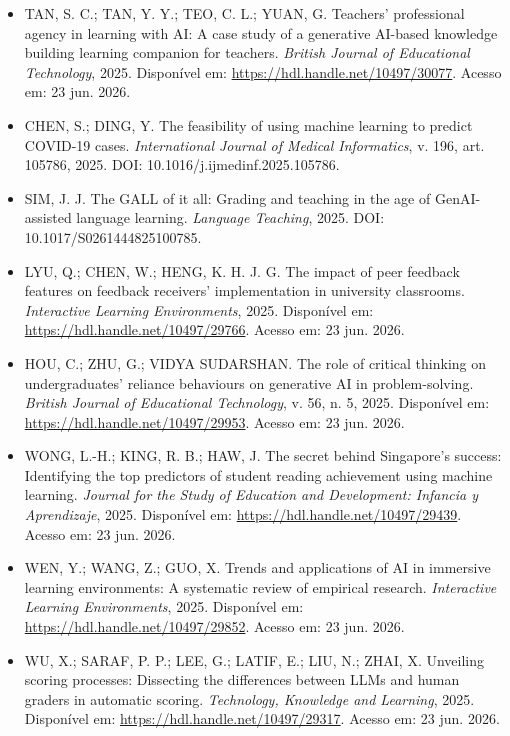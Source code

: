 \documentclass[english]{textolivre}
\begin{document}
\begin{itemize}
\item[] TAN, S. C.; TAN, Y. Y.; TEO, C. L.; YUAN, G. Teachers’ professional agency in learning with AI: A case study of a generative AI-based knowledge building learning companion for teachers. \textit{British Journal of Educational Technology}, 2025. Disponível em: \url{https://hdl.handle.net/10497/30077}. Acesso em: 23 jun. 2026.

\item[] CHEN, S.; DING, Y. The feasibility of using machine learning to predict COVID-19 cases. \textit{International Journal of Medical Informatics}, v. 196, art. 105786, 2025. DOI: 10.1016/j.ijmedinf.2025.105786.

\item[] SIM, J. J. The GALL of it all: Grading and teaching in the age of GenAI-assisted language learning. \textit{Language Teaching}, 2025. DOI: 10.1017/S0261444825100785.

\item[] LYU, Q.; CHEN, W.; HENG, K. H. J. G. The impact of peer feedback features on feedback receivers’ implementation in university classrooms. \textit{Interactive Learning Environments}, 2025. Disponível em: \url{https://hdl.handle.net/10497/29766}. Acesso em: 23 jun. 2026.

\item[] HOU, C.; ZHU, G.; VIDYA SUDARSHAN. The role of critical thinking on undergraduates’ reliance behaviours on generative AI in problem-solving. \textit{British Journal of Educational Technology}, v. 56, n. 5, 2025. Disponível em: \url{https://hdl.handle.net/10497/29953}. Acesso em: 23 jun. 2026.

\item[] WONG, L.-H.; KING, R. B.; HAW, J. The secret behind Singapore’s success: Identifying the top predictors of student reading achievement using machine learning. \textit{Journal for the Study of Education and Development: Infancia y Aprendizaje}, 2025. Disponível em: \url{https://hdl.handle.net/10497/29439}. Acesso em: 23 jun. 2026.

\item[] WEN, Y.; WANG, Z.; GUO, X. Trends and applications of AI in immersive learning environments: A systematic review of empirical research. \textit{Interactive Learning Environments}, 2025. Disponível em: \url{https://hdl.handle.net/10497/29852}. Acesso em: 23 jun. 2026.

\item[] WU, X.; SARAF, P. P.; LEE, G.; LATIF, E.; LIU, N.; ZHAI, X. Unveiling scoring processes: Dissecting the differences between LLMs and human graders in automatic scoring. \textit{Technology, Knowledge and Learning}, 2025. Disponível em: \url{https://hdl.handle.net/10497/29317}. Acesso em: 23 jun. 2026.


\end{itemize}
\end{document}
